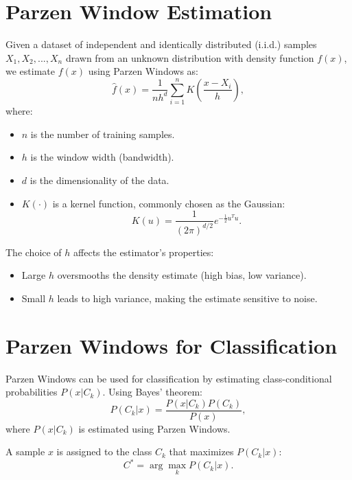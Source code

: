 \documentclass{article}
\begin{document}
\section{Parzen Window Estimation}
Given a dataset of independent and identically distributed (i.i.d.) samples $X_1, X_2, ..., X_n$ drawn from an unknown distribution with density function $f(x)$, we estimate $f(x)$ using Parzen Windows as:
\begin{equation}
    \hat{f}(x) = \frac{1}{n h^d} \sum_{i=1}^{n} K \left( \frac{x - X_i}{h} \right),
\end{equation}
where:
\begin{itemize}
    \item $n$ is the number of training samples.
    \item $h$ is the window width (bandwidth).
    \item $d$ is the dimensionality of the data.
    \item $K(\cdot)$ is a kernel function, commonly chosen as the Gaussian:
    \begin{equation}
        K(u) = \frac{1}{(2\pi)^{d/2}} e^{-\frac{1}{2} u^T u}.
    \end{equation}
\end{itemize}

The choice of $h$ affects the estimator’s properties:
\begin{itemize}
    \item Large $h$ oversmooths the density estimate (high bias, low variance).
    \item Small $h$ leads to high variance, making the estimate sensitive to noise.
\end{itemize}

\section{Parzen Windows for Classification}
Parzen Windows can be used for classification by estimating class-conditional probabilities $P(x | C_k)$. Using Bayes' theorem:
\begin{equation}
    P(C_k | x) = \frac{P(x | C_k) P(C_k)}{P(x)},
\end{equation}
where $P(x | C_k)$ is estimated using Parzen Windows.

A sample $x$ is assigned to the class $C_k$ that maximizes $P(C_k | x)$:
\begin{equation}
    C^* = \arg \max_k P(C_k | x).
\end{equation}
\end{document}
